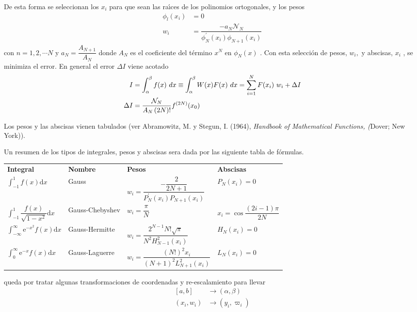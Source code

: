 \documentclass[spanish,titlepage,11pt]{article}
\begin{document}
De esta forma se seleccionan los $x_{i}$ para que sean las ra\'{\i}ces de los
polinomios ortogonales, y los pesos
\begin{align}
\phi_{l}(x_{i})  &  =0\\
w_{i}  &  =\dfrac{-a_{N}\mathcal{N}_{N}}{\phi_{N}^{\prime}(x_{i})\phi
_{N+1}(x_{i})}%
\end{align}
con $n=1,2,\cdots N$ y $a_{N}=\dfrac{A_{N+1}}{A_{N}}$ donde $A_{N}$ es el
coeficiente del t\'{e}rmino $x^{N}$ en $\phi_{N}(x)$ . Con esta selecci\'{o}n
de pesos, $w_{i},$ y abscisas, $x_{i}$ , se minimiza el error. En general el
error $\Delta I$ viene acotado
\begin{align}
I  &  =\int_{\alpha}^{\beta}f(x)\ {\normalsize d}x\equiv\int_{\alpha}^{\beta
}W(x)F(x)\ {\normalsize d}x=\sum_{i=1}^{N}F(x_{i})\ w_{i}+\Delta I\\
\Delta I  &  =\dfrac{\mathcal{N}_{N}}{A_{N}\left(  2N\right)  !}f^{\left(
2N\right)  }(x_{0})
\end{align}

Los pesos y las abscisas vienen tabulados (ver Abramowitz, M. y Stegun, I.
(1964), \textit{Handbook of Mathematical Functions, (}Dover; New York)).

Un resumen de los tipos de integrales, pesos y abscisas sera dada por las
siguiente tabla de f\'{o}rmulas.

\begin{center}%
\begin{tabular}
[c]{llll}%
\textbf{Integral} & \textbf{Nombre} & \textbf{Pesos} & \textbf{Abscisas}\\
$\int_{-1}^{1}f(x)\mathrm{d}x$ & Gauss & $w_{i}=\dfrac{-\dfrac{2}{2N+1}}%
{P_{N}^{\prime}(x_{i})P_{N+1}(x_{i})}$ & $P_{N}(x_{i})=0$\\
$\int_{-1}^{1}\dfrac{f(x)}{\sqrt{1-x^{2}}}\mathrm{d}x$ & Gauss-Chebyshev &
$w_{i}=\dfrac{\pi}{N}$ & $x_{i}=\cos\dfrac{\left(  2i-1\right)  \pi}{2N}$\\
$\int_{-\infty}^{\infty}\mathrm{e}^{-x^{2}}f(x)\mathrm{d}x$ & Gauss-Hermitte &
$w_{i}=\dfrac{2^{N-1}N!\sqrt{\pi}}{N^{2}H_{N-1}^{2}(x_{i})} $ & $H_{N}%
(x_{i})=0$\\
$\int_{0}^{\infty}\mathrm{e}^{-x}f(x)\mathrm{d}x$ & Gauss-Laguerre &
$w_{i}=\dfrac{\left(  N!\right)  ^{2}x_{i}}{\left(  N+1\right)  ^{2}%
L_{N+1}^{2}(x_{i})}$ & $L_{N}(x_{i})=0$%
\end{tabular}
\end{center}

queda por tratar algunas transformaciones de coordenadas y re-escalamiento
para llevar
\begin{align}
\left[  a,b\right]   &  \longrightarrow\left(  \alpha,\beta\right) \\
\left(  x_{i},w_{i}\right)   &  \longrightarrow\left(  y_{i},\varpi
_{i}\right)
\end{align}
\end{document}
